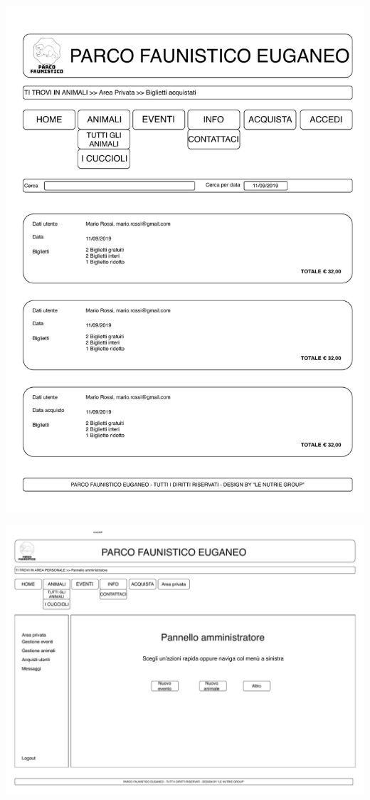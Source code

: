 \begin{center}
\begin{minipage}{0.4\linewidth}
            \includegraphics[width=\linewidth]{./../docs/Analisi/bozze/riepilogoAcquisti.pdf}
        \end{minipage}
        \hfill
        \begin{minipage}{0.5\linewidth}
            \includegraphics[width=\linewidth]{./../docs/Analisi/bozze/areaPrivata.pdf}
        \end{minipage}
    \end{center}
        
